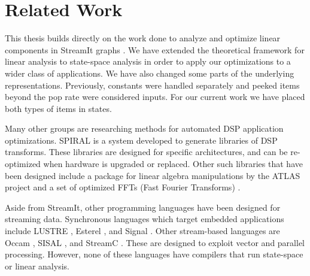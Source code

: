 \section{Related Work}

    This thesis builds directly on the work done to analyze and
optimize linear components in StreamIt graphs \cite{Lamb}. We have
extended the theoretical framework for linear analysis to
state-space analysis in order to apply our optimizations to a
wider class of applications. We have also changed some parts of
the underlying representations. Previously, constants were handled
separately and peeked items beyond the pop rate were considered
inputs. For our current work we have placed both types of items in
states.

    Many other groups are researching methods for automated DSP
application optimizations. SPIRAL \cite{Spiral} is a system
developed to generate libraries of DSP transforms. These libraries
are designed for specific architectures, and can be re-optimized
when hardware is upgraded or replaced. Other such libraries that
have been designed include a package for linear algebra
manipulations by the ATLAS project \cite{Atlas} and a set of
optimized FFTs (Fast Fourier Transforms) \cite{fftw}.

    Aside from StreamIt, other programming languages have been
designed for streaming data. Synchronous languages which target
embedded applications include LUSTRE \cite{Lustre}, Esterel
\cite{Esterel}, and Signal \cite{Signal}. Other stream-based
languages are Occam \cite{Occam}, SISAL \cite{sisal}, and StreamC
\cite{streamc}. These are designed to exploit vector and parallel
processing. However, none of these languages have compilers that
run state-space or linear analysis.
